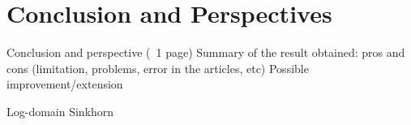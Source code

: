 \section{Conclusion and Perspectives}

Conclusion and perspective (~1 page)
Summary of the result obtained: pros and cons (limitation, problems, error in the articles, etc)
Possible improvement/extension

Log-domain Sinkhorn 
